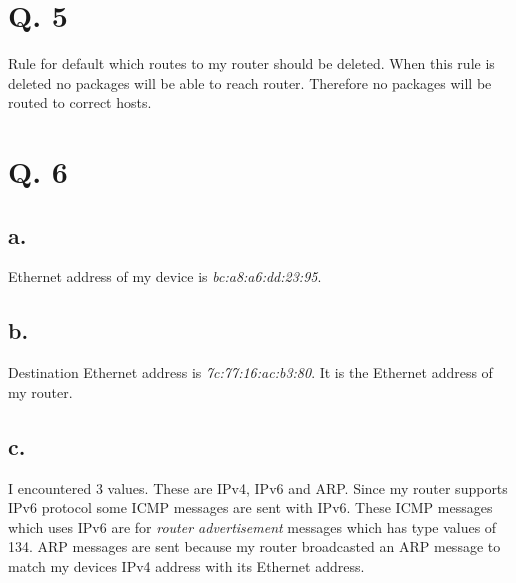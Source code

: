 \documentclass[11pt]{article}
\begin{document}
	\section*{Q. 5}
	Rule for default which routes to my router should be deleted. When this rule is deleted no packages will be able to reach router.
	Therefore no packages will be routed to correct hosts.
	
	\section*{Q. 6}
	\subsection*{a.}
	Ethernet address of my device is \emph{bc:a8:a6:dd:23:95}.
	\subsection*{b.}
	Destination Ethernet address is \emph{7c:77:16:ac:b3:80}. It is the Ethernet address of my router.
	\subsection*{c.}
	I encountered 3 values. These are IPv4, IPv6 and ARP. Since my router supports IPv6 protocol some ICMP messages are sent with IPv6.
	These ICMP messages which uses IPv6 are for \emph{router advertisement} messages which has type values of 134. ARP messages are sent because my router
	broadcasted an ARP message to match my devices IPv4 address with its Ethernet address.
\end{document}
